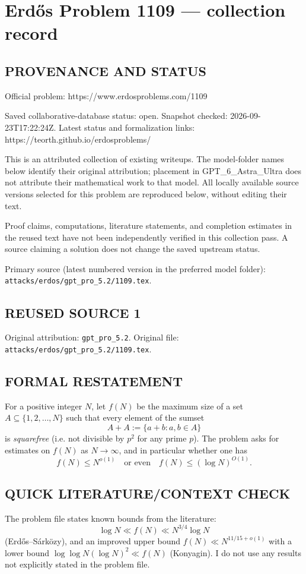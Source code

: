 \section*{Erd\H{o}s Problem 1109 --- collection record}

\subsection*{PROVENANCE AND STATUS}
Official problem: https://www.erdosproblems.com/1109

Saved collaborative-database status: open.
Snapshot checked: 2026-09-23T17:22:24Z.
Latest status and formalization links: https://teorth.github.io/erdosproblems/

This is an attributed collection of existing writeups. The model-folder names below identify their original attribution; placement in GPT\_6\_Astra\_Ultra does not attribute their mathematical work to that model. All locally available source versions selected for this problem are reproduced below, without editing their text.

Proof claims, computations, literature statements, and completion estimates in the reused text have not been independently verified in this collection pass. A source claiming a solution does not change the saved upstream status.

Primary source (latest numbered version in the preferred model folder): \texttt{attacks/erdos/gpt\_pro\_5.2/1109.tex}.

\subsection*{REUSED SOURCE 1}
Original attribution: \texttt{gpt\_pro\_5.2}.
Original file: \texttt{attacks/erdos/gpt\_pro\_5.2/1109.tex}.


\subsection*{FORMAL RESTATEMENT}
For a positive integer $N$, let $f(N)$ be the maximum size of a set $A\subseteq\{1,2,\dots,N\}$ such that every element of the sumset
\[A+A := \{a+b : a,b\in A\}\]
is \emph{squarefree} (i.e. not divisible by $p^2$ for any prime $p$).
The problem asks for estimates on $f(N)$ as $N\to\infty$, and in particular whether one has
\[f(N)\le N^{o(1)}\quad\text{or even}\quad f(N)\le (\log N)^{O(1)}.
\]

\subsection*{QUICK LITERATURE/CONTEXT CHECK}
The problem file states known bounds from the literature:
\[\log N \ll f(N) \ll N^{3/4}\log N\]
(Erd\H{o}s--S\'ark\"ozy), and an improved upper bound $f(N)\ll N^{11/15+o(1)}$ with a lower bound $\log\log N (\log N)^2\ll f(N)$ (Konyagin).
I do not use any results not explicitly stated in the problem file.

